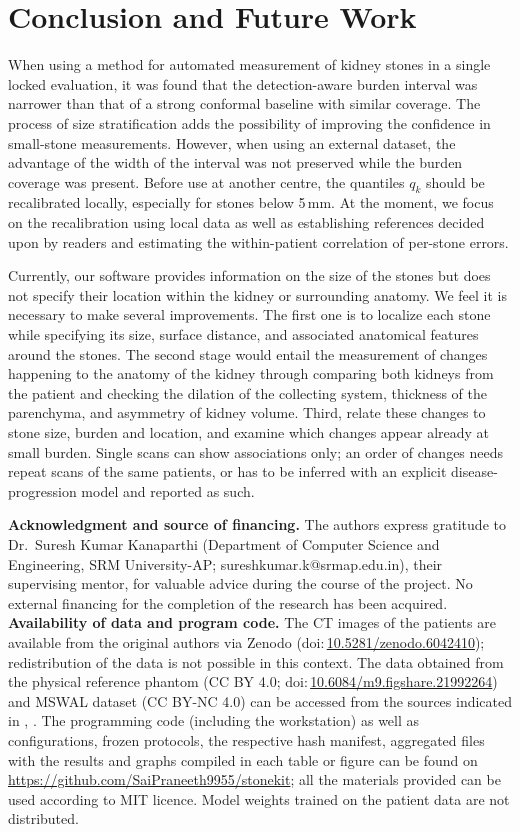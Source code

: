 \documentclass[conference]{IEEEtran}
\begin{document}
\section{Conclusion and Future Work}
When using a method for automated measurement of kidney stones in a single locked evaluation, it was found that the detection-aware burden interval was narrower than that of a strong conformal baseline with similar coverage. The process of size stratification adds the possibility of improving the confidence in small-stone measurements. However, when using an external dataset, the advantage of the width of the interval was not preserved while the burden coverage was present. Before use at another centre, the quantiles $q_k$ should be recalibrated locally, especially for stones below 5\,mm. At the moment, we focus on the recalibration using local data as well as establishing references decided upon by readers and estimating the within-patient correlation of per-stone errors.

Currently, our software provides information on the size of the stones but does not specify their location within the kidney or surrounding anatomy. We feel it is necessary to make several improvements. The first one is to localize each stone while specifying its size, surface distance, and associated anatomical features around the stones. The second stage would entail the measurement of changes happening to the anatomy of the kidney through comparing both kidneys from the patient and checking the dilation of the collecting system, thickness of the parenchyma, and asymmetry of kidney volume. Third, relate these changes to stone size, burden and location, and examine which changes appear already at small burden. Single scans can show associations only; an order of changes needs repeat scans of the same patients, or has to be inferred with an explicit disease-progression model and reported as such.

\noindent\textbf{Acknowledgment and source of financing.} The authors express gratitude to Dr.~Suresh Kumar Kanaparthi (Department of Computer Science and Engineering, SRM University-AP; sureshkumar.k@srmap.edu.in), their supervising mentor, for valuable advice during the course of the project. No external financing for the completion of the research has been acquired. \textbf{Availability of data and program code.} The CT images of the patients are available from the original authors via Zenodo (doi:\,\url{10.5281/zenodo.6042410}); redistribution of the data is not possible in this context. The data obtained from the physical reference phantom (CC BY 4.0; doi:\,\url{10.6084/m9.figshare.21992264}) and MSWAL dataset (CC BY-NC 4.0) can be accessed from the sources indicated in \cite{neubauer2023}, \cite{wu2026mswal}. The programming code (including the workstation) as well as configurations, frozen protocols, the respective hash manifest, aggregated files with the results and graphs compiled in each table or figure can be found on \url{https://github.com/SaiPraneeth9955/stonekit}; all the materials provided can be used according to MIT licence. Model weights trained on the patient data are not distributed.

\renewcommand{\footnotesize}{\scriptsize}


\end{document}

